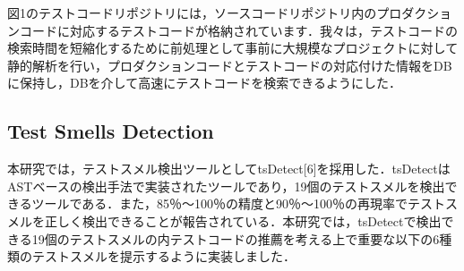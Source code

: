 \documentclass[conference]{IEEEtran}
\begin{document}
図1のテストコードリポジトリには，ソースコードリポジトリ内のプロダクションコードに対応するテストコードが格納されています．我々は，テストコードの検索時間を短縮化するために前処理として事前に大規模なプロジェクトに対して静的解析を行い，プロダクションコードとテストコードの対応付けた情報をDBに保持し，DBを介して高速にテストコードを検索できるようにした．

\subsection{Test Smells Detection}
本研究では，テストスメル検出ツールとしてtsDetect[6]を採用した．tsDetectはASTベースの検出手法で実装されたツールであり，19個のテストスメルを検出できるツールである．また，85％〜100％の精度と90％〜100％の再現率でテストスメルを正しく検出できることが報告されている．本研究では，tsDetectで検出できる19個のテストスメルの内テストコードの推薦を考える上で重要な以下の6種類のテストスメルを提示するように実装しました．
\end{document}
